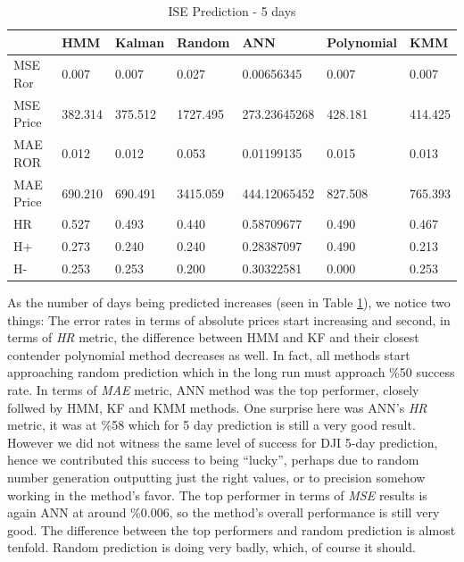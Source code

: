 \begin{table}[h]
\caption{\label{table2}ISE Prediction - 5 days}
\vspace{0.3cm}
\begin{tabular}{|l|l|l|l|l|l|l|}
\hline
 &                  HMM &       Kalman &   Random &        ANN &     Polynomial &    KMM\\
\hline
   MSE Ror &      0.007 &      0.007 &      0.027 & 0.00656345 &      0.007 &      0.007\\
\hline
 MSE Price &    382.314 &    375.512 &   1727.495 & 273.23645268 &    428.181 &    414.425\\
\hline
   MAE ROR &      0.012 &      0.012 &      0.053 & 0.01199135 &      0.015 &      0.013\\
\hline
 MAE Price &    690.210 &    690.491 &   3415.059 & 444.12065452 &    827.508 &    765.393\\
\hline
        HR &      0.527 &      0.493 &      0.440 & 0.58709677 &      0.490 &      0.467\\
\hline
        H+ &      0.273 &      0.240 &      0.240 & 0.28387097 &      0.490 &      0.213\\
\hline
        H- &      0.253 &      0.253 &      0.200 & 0.30322581 &      0.000 &      0.253\\
\hline
\end{tabular}
\end{table}

As the number of days being predicted increases (seen in Table \ref{table2}), we
notice two things: The error rates in terms of absolute prices start increasing
and second, in terms of {\em HR} metric, the difference between HMM and KF and
their closest contender polynomial method decreases as well. In fact, all
methods start approaching random prediction which in the long run must approach
\%50 success rate. In terms of {\em MAE} metric, ANN method was the top
performer, closely follwed by HMM, KF and KMM methods. One surprise here was
ANN's {\em HR} metric, it was at \%58 which for 5 day prediction is still a very
good result. However we did not witness the same level of success for DJI 5-day
prediction, hence we contributed this success to being ``lucky'', perhaps due to
random number generation outputting just the right values, or to precision
somehow working in the method's favor. The top performer in terms of {\em MSE}
results is again ANN at around \%0.006, so the method's overall performance is
still very good. The difference between the top performers and random prediction
is almost tenfold. Random prediction is doing very badly, which, of course it
should.

